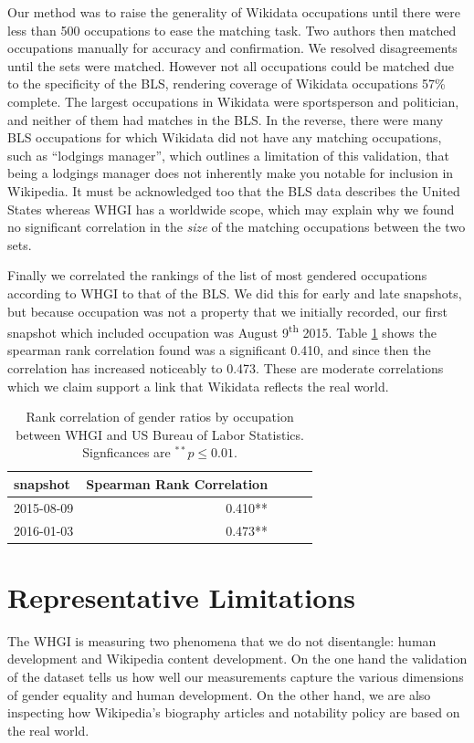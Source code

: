 \documentclass[letterpaper]{article}
\begin{document}
Our method was to raise the generality of Wikidata occupations until there were less than 500 occupations to ease the matching task. Two authors then matched occupations manually for accuracy and confirmation. We resolved disagreements until the sets were matched. However not all occupations could be matched due to the specificity of the BLS, rendering coverage of Wikidata occupations 57\% complete. The largest occupations in Wikidata were sportsperson and politician, and neither of them had matches in the BLS. In the reverse, there were many BLS occupations for which Wikidata did not have any matching occupations, such as ``lodgings manager'', which outlines a limitation of this validation, that being a lodgings manager does not inherently make you notable for inclusion in Wikipedia. It must be acknowledged too that the BLS data describes the United States whereas WHGI has a worldwide scope, which may explain why we found no significant correlation in the \textit{size} of the matching occupations between the two sets.

Finally we correlated the rankings of the list of most gendered occupations according to WHGI to that of the BLS. We did this for early and late snapshots, but because occupation was not a property that we initially recorded, our first snapshot which included occupation was August 9\textsuperscript{th} 2015.  Table \ref{table:bls} shows the spearman rank correlation found was a significant 0.410, and since then the correlation has increased noticeably to 0.473. These are moderate correlations which we claim support a link that Wikidata reflects the real world.

\begin{table}
\caption{Rank correlation of gender ratios by occupation between WHGI and US
Bureau of Labor Statistics. Signficances are $ ^{**}p\leq 0.01$.}
\begin{tabular}{lrrrr}
\toprule
snapshot &  Spearman Rank Correlation \\
\midrule
2015-08-09 & 0.410**  \\
2016-01-03 & 0.473**  \\
\bottomrule
\end{tabular}
\label{table:bls}
\end{table}

\section{Representative Limitations}
The WHGI is measuring two phenomena that we do not disentangle: human development and Wikipedia content development. On the one hand the validation of the dataset tells us how well our measurements capture the various dimensions of gender equality and human development. On the other hand, we are also inspecting how Wikipedia's biography articles and notability policy are based on the real world.
\end{document}
